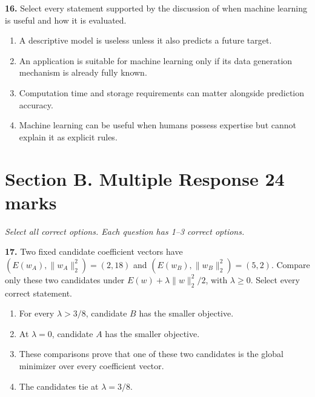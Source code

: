 \documentclass[11pt,a4paper]{article}
\begin{document}
\par\noindent\begin{minipage}{\linewidth}
\textbf{16.} Select every statement supported by the discussion of when machine learning is useful and how it is evaluated.
\begin{enumerate}[label=(\Alph*),leftmargin=8mm,itemsep=2pt,topsep=2pt]
\item A descriptive model is useless unless it also predicts a future target.
\item An application is suitable for machine learning only if its data generation mechanism is already fully known.
\item Computation time and storage requirements can matter alongside prediction accuracy.
\item Machine learning can be useful when humans possess expertise but cannot explain it as explicit rules.
\end{enumerate}

\end{minipage}\par\vspace{3mm}
\newpage\section*{Section B. Multiple Response \hfill 24 marks}
\textit{Select all correct options. Each question has 1--3 correct options.}\par
\par\noindent\begin{minipage}{\linewidth}
\textbf{17.} Two fixed candidate coefficient vectors have \((E(w_A),\|w_A\|_2^2)=(2,18)\) and \((E(w_B),\|w_B\|_2^2)=(5,2)\). Compare only these two candidates under \(E(w)+\lambda\|w\|_2^2/2\), with \(\lambda\geq0\). Select every correct statement.
\begin{enumerate}[label=(\Alph*),leftmargin=8mm,itemsep=2pt,topsep=2pt]
\item For every \(\lambda>3/8\), candidate \(B\) has the smaller objective.
\item At \(\lambda=0\), candidate \(A\) has the smaller objective.
\item These comparisons prove that one of these two candidates is the global minimizer over every coefficient vector.
\item The candidates tie at \(\lambda=3/8\).
\end{enumerate}

\end{minipage}\par\vspace{3mm}
\end{document}
